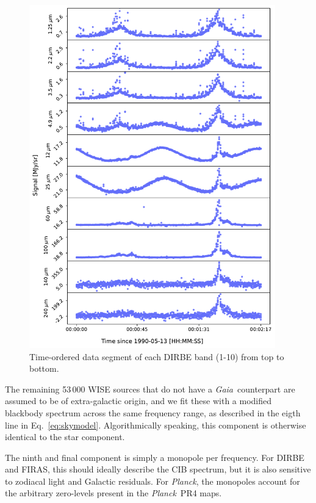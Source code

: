 \documentclass{aa}
\def\Planck{\textit{Planck}}
\def\GAIA{\textit{Gaia}}
\begin{document}
\begin{figure}
  \centering
   	\includegraphics[width=0.95\textwidth]{figs/tod.pdf}
  	\caption{Time-ordered data segment of each DIRBE band (1-10) from top to bottom.}
	\label{fig: cios}
\end{figure}

The remaining 53\,000 WISE sources that do not have a \GAIA\
counterpart are assumed to be of extra-galactic origin, and we fit
these with a modified blackbody spectrum across the same frequency
range, as described in the eigth line in
Eq.~\eqref{eq:skymodel}. Algorithmically speaking, this component is
otherwise identical to the star component.

The ninth and final component is simply a monopole per frequency. For
DIRBE and FIRAS, this should ideally describe the CIB spectrum, but it
is also sensitive to zodiacal light and Galactic residuals. For
\Planck, the monopoles account for the arbitrary zero-levels present
in the \Planck\ PR4 maps.
\end{document}
